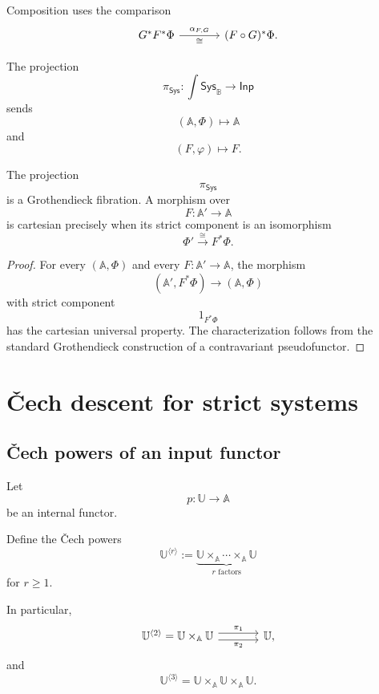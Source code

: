 Composition uses the comparison
\[
\begin{tikzcd}[column sep=large]
    G^\ast F^\ast\Phi
        \arrow[r, "\alpha_{F,G}", "\cong"']
    &
    (F\circ G)^\ast\Phi.
\end{tikzcd}
\]

The projection
\[
    \pi_{\mathsf{Sys}}:
    \int\mathsf{Sys}_{\mathbb B}
    \to
    \mathsf{Inp}
\]
sends
\[
    (\mathbb A,\Phi)\longmapsto\mathbb A
\]
and
\[
    (F,\varphi)\longmapsto F.
\]

\begin{proposition}
\label{prop:fibration-strict-systems}
The projection
\[
    \pi_{\mathsf{Sys}}
\]
is a Grothendieck fibration. A morphism over
\[
    F:\mathbb A'\to\mathbb A
\]
is cartesian precisely when its strict component is an isomorphism
\[
    \Phi'\xrightarrow{\cong}F^\ast\Phi.
\]
\end{proposition}

\begin{proof}
For every \((\mathbb A,\Phi)\) and every
\(F:\mathbb A'\to\mathbb A\), the morphism
\[
    (\mathbb A',F^\ast\Phi)
    \longrightarrow
    (\mathbb A,\Phi)
\]
with strict component
\[
    1_{F^\ast\Phi}
\]
has the cartesian universal property. The characterization follows from the
standard Grothendieck construction of a contravariant pseudofunctor.
\end{proof}

\section{Čech descent for strict systems}
\label{sec:cech-descent-strict-systems}

\subsection{Čech powers of an input functor}
\label{subsec:cech-powers-input-functor}

Let
\[
    p:\mathbb U\to\mathbb A
\]
be an internal functor.

Define the Čech powers
\[
    \mathbb U^{\langle r\rangle}
    :=
    \underbrace{
    \mathbb U\times_{\mathbb A}
    \cdots\times_{\mathbb A}\mathbb U
    }_{r\text{ factors}}
\]
for \(r\geq1\).

In particular,
\[
\begin{tikzcd}[column sep=large]
    \mathbb U^{\langle2\rangle}
        =
    \mathbb U\times_{\mathbb A}\mathbb U
        \arrow[r, shift left=0.7ex, "\pi_1"]
        \arrow[r, shift right=0.7ex, "\pi_2"']
    &
    \mathbb U,
\end{tikzcd}
\]
and
\[
    \mathbb U^{\langle3\rangle}
    =
    \mathbb U\times_{\mathbb A}
    \mathbb U\times_{\mathbb A}\mathbb U.
\]


